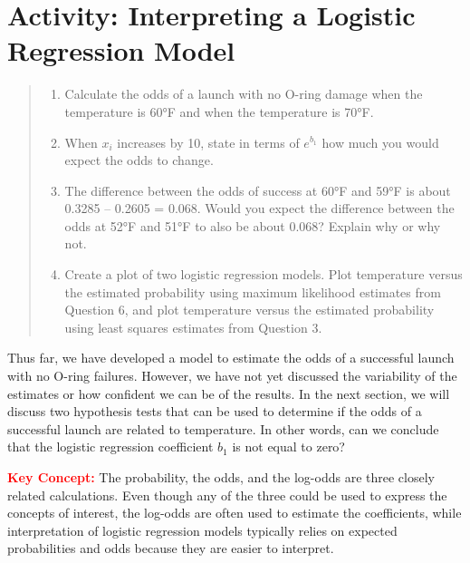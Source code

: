 \documentclass[
]{report}
\providecommand{\tightlist}{%
  \setlength{\itemsep}{0pt}\setlength{\parskip}{0pt}}
\begin{document}
\section{Activity: Interpreting a Logistic Regression Model}\label{activity-interpreting-a-logistic-regression-model}

\begin{quote}
\begin{enumerate}
\def\labelenumi{\arabic{enumi}.}
\setcounter{enumi}{7}
\tightlist
\item
  Calculate the odds of a launch with no O-ring damage when the temperature is 60°F and when the temperature is 70°F.\\
\item
  When \(x_i\) increases by 10, state in terms of \(e^{b_1}\) how much you would expect the odds to change.\\
\item
  The difference between the odds of success at 60°F and 59°F is about 0.3285 -- 0.2605 = 0.068. Would you expect the difference between the odds at 52°F and 51°F to also be about 0.068? Explain why or why not.\\
\item
  Create a plot of two logistic regression models. Plot temperature versus the estimated probability using maximum likelihood estimates from Question 6, and plot temperature versus the estimated probability using least squares estimates from Question 3.
\end{enumerate}
\end{quote}

Thus far, we have developed a model to estimate the odds of a successful launch with no O-ring failures. However, we have not yet discussed the variability of the estimates or how confident we can be of the results. In the next section, we will discuss two hypothesis tests that can be used to determine if the odds of a successful launch are related to temperature. In other words, can we conclude that the logistic regression coefficient \(b_1\) is not equal to zero?

\Large

\textbf{\textcolor{red}{Key Concept:}}
\color{red}
The probability, the odds, and the log-odds are three closely related calculations. Even though any of
the three could be used to express the concepts of interest, the log-odds are often used to estimate the
coefficients, while interpretation of logistic regression models typically relies on expected probabilities
and odds because they are easier to interpret.
\color{black}
\normalsize
\end{document}
